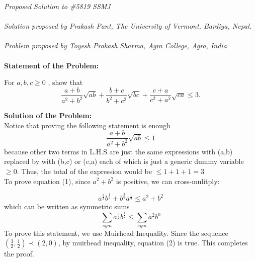 \documentclass[12pt]{article}
\begin{document}
\textit{Proposed Solution to \#5819 SSMJ }\\ \\
\textit{Solution proposed by Prakash Pant, The University of Vermont, Bardiya, Nepal.}\\ \\
\textit{Problem proposed by Toyesh Prakash Sharma, Agra College, Agra, India
} \\ \\
\textbf{Statement of the Problem:}

For \(a, b, c \ge 0\) , show that
\[
\frac{a + b}{a^2 + b^2} \sqrt{ab}
+ \frac{b + c}{b^2 + c^2} \sqrt{bc}
+ \frac{c + a}{c^2 + a^2} \sqrt{ca}
\le 3.
\]

\textbf{Solution of the Problem:} \\
Notice that proving the following statement is enough 
\begin{equation} \frac{a+b}{a^2+b^2}\sqrt{ab} \le 1 \end{equation}
because other two terms in L.H.S are just the same expressions with (a,b) replaced by with (b,c) or (c,a) each of which is just a generic dummy variable \( \ge 0\). Thus, the total of the expression would be \( \le 1+1+1 = 3\)\\

To prove equation (1), since \( a^2 + b^2\) is positive, we can cross-mulitply:

\[ a^{\frac{3}{2}} b^{\frac{1}{2}} + b^{\frac{3}{2}}a^{\frac{1}{2}} \le a^2 +b^2\]
which can be written as symmetric sums
\begin{equation} \sum_{sym}a^{\frac{3}{2}}b^{\frac{1}{2}} \le \sum_{sym} a^2 b^0 \end{equation}
To prove this statement, we use Muirhead Inequality. Since the sequence \( (\frac{3}{2},\frac{1}{2}) \prec (2,0)\), by muirhead inequality, equation (2) is true. This completes the proof. 
\end{document}
